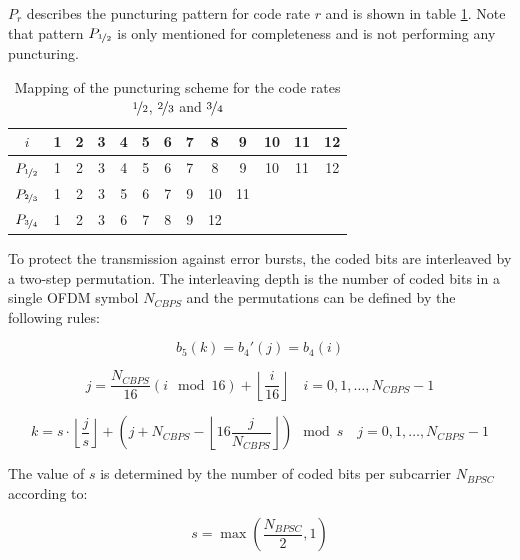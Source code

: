 $P_{r}$ describes the puncturing pattern for code rate $r$ and is shown in table \ref{tab:Punct_IEEE}. Note that pattern $P_{\nicefrac{1}{2}}$ is only mentioned for completeness and is not performing any puncturing.


\begin{table}[h]
	\centering
		\begin{tabular}{c|c c c c c c c c c c c c}
		\toprule
			$i$ 								& 1 & 2 & 3 & 4 & 5 & 6 & 7 & 8  & 9  & 10 & 11 & 12\\
		\midrule
		$P_{\nicefrac{1}{2}}$ & 1 & 2 & 3 & 4 & 5 & 6 & 7 & 8  & 9  & 10 & 11 & 12\\
		\hline
		$P_{\nicefrac{2}{3}}$ & 1 & 2 & 3 & 5 & 6 & 7 & 9 & 10 & 11 &    &    &   \\	
		\hline
		$P_{\nicefrac{3}{4}}$ & 1 & 2 & 3 & 6 & 7 & 8 & 9 & 12 &    &    &    &   \\
			\bottomrule
		\end{tabular}
		\caption{Mapping of the puncturing scheme for the code rates $\nicefrac{1}{2}$, $\nicefrac{2}{3}$ and $\nicefrac{3}{4}$}
		\label{tab:Punct_IEEE}
\end{table}

To protect the transmission against error bursts, the coded bits are interleaved by a two-step permutation. The interleaving depth is the number of coded bits in a single \ac{OFDM} symbol $N_{CBPS}$ and the permutations can be defined by the following rules:

\begin{equation}
b_5(k) = b_4'(j) = b_4(i)
\end{equation}

\begin{equation}
j = \frac{N_{CBPS}}{16} (i \mod 16) + \left\lfloor \frac{i}{16} \right\rfloor \quad i = 0,1,\dots,N_{CBPS}-1
\end{equation}

\begin{equation}
k = s \cdot \left\lfloor \frac{j}{s} \right\rfloor + (j + N_{CBPS} - \left\lfloor 16  \frac{j}{N_{CBPS}}  \right\rfloor ) \mod s \quad  j = 0,1,\dots,N_{CBPS}-1
\end{equation}

The value of $s$ is determined by the number of coded bits per subcarrier $N_{BPSC}$ according to:

\begin{equation}
	s = \max \left ( \frac{N_{BPSC}}{2},1 \right )
\end{equation}


